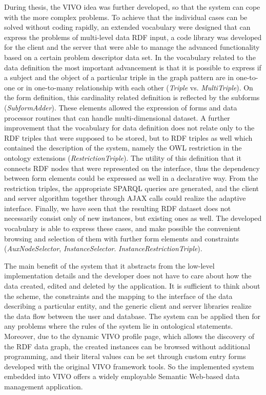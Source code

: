During thesis, the VIVO idea was further developed, so that the system can cope with the more complex problems. To achieve that the individual cases can be solved without coding rapidly, an extended vocabulary were designed that can express the problems of multi-level data RDF input, a code library was developed for the client and the server that were able to manage the advanced functionality based on a certain problem descriptor data set. In the vocabulary related to the data definition the most important advancement is that it is possible to express if a subject and the object of a particular triple in the graph pattern are in one-to-one or in one-to-many relationship with each other (\textit{Triple} vs. \textit{MultiTriple}). On the form definition, this cardinality related definition is reflected by the subforms (\textit{SubformAdder}). These elements allowed the expression of forms and data processor routines that can handle multi-dimensional dataset. A further improvement that the vocabulary for data definition does not relate only to the RDF triples that were supposed to be stored, but to RDF triples as well which contained the description of the system, namely the OWL restriction in the ontology extensions (\textit{RestrictionTriple}). The utility of this definition that it connects RDF nodes that were represented on the interface, thus the dependency between form elements could be expressed as well in a declarative way. From the restriction triples, the appropriate SPARQL queries are generated, and the client and server algorithm together through AJAX calls could realize the adaptive interface. Finally, we have seen that the resulting RDF dataset does not necessarily consist only of new instances, but existing ones as well. The developed vocabulary is able to express these cases, and make possible the convenient browsing and selection of them with further form elements and constraints (\textit{AuxNodeSelector}, \textit{InstanceSelector}. \textit{InstanceRestrictionTriple}). 

The main benefit of the system that it abstracts from the low-level implementation details and the developer does not have to care about how the data created, edited and deleted by the application. It is sufficient to think about the scheme, the constraints and the mapping to the interface of the data describing a particular entity, and the generic client and server libraries realize the data flow between the user and database. The system can be applied then for any problems where the rules of the system lie in ontological statements. Moreover, due to the dynamic VIVO profile page, which allows the discovery of the RDF data graph, the created instances can be browsed without additional programming, and their literal values can be set through custom entry forms developed with the original VIVO framework tools. So the implemented system embedded into VIVO offers a widely employable Semantic Web-based data management application.
